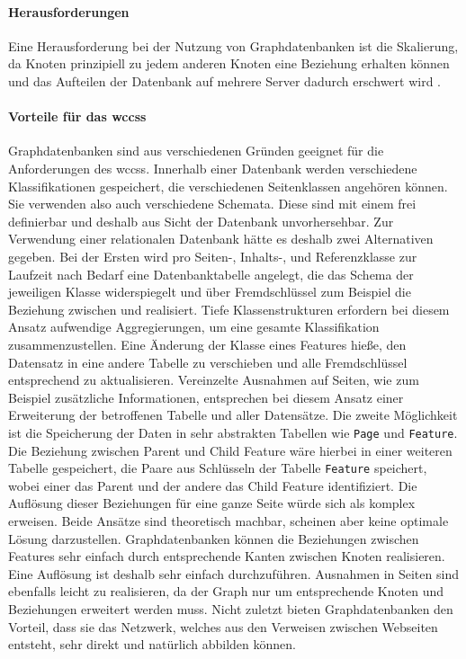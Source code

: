     \paragraph*{Herausforderungen}
    Eine Herausforderung bei der Nutzung von Graphdatenbanken ist die Skalierung,
    da Knoten prinzipiell zu jedem anderen Knoten eine Beziehung erhalten können
    und das Aufteilen der Datenbank auf mehrere Server dadurch erschwert wird
    \cite[Kapitel 11.2.5]{sadalage:nosql}.

    \paragraph*{Vorteile für das \glspl{wccs}}
    Graphdatenbanken sind aus verschiedenen Gründen geeignet für die Anforderungen des \glspl{wccs}.
    Innerhalb einer Datenbank werden verschiedene Klassifikationen gespeichert,
    die verschiedenen Seitenklassen angehören können.
    Sie verwenden also auch verschiedene Schemata.
    Diese sind mit einem {\classificationModel} frei definierbar und deshalb aus Sicht der Datenbank unvorhersehbar.
    Zur Verwendung einer relationalen Datenbank hätte es deshalb zwei Alternativen gegeben.
    Bei der Ersten wird pro Seiten-, Inhalts-, und Referenzklasse zur Laufzeit nach Bedarf eine Datenbanktabelle angelegt,
    die das Schema der jeweiligen Klasse widerspiegelt und über Fremdschlüssel zum Beispiel die Beziehung
    zwischen {\parentFeature} und {\childFeature} realisiert.
    Tiefe Klassenstrukturen erfordern bei diesem Ansatz aufwendige Aggregierungen,
    um eine gesamte Klassifikation zusammenzustellen.
    Eine Änderung der Klasse eines Features hieße, den Datensatz in eine andere Tabelle zu verschieben
    und alle Fremdschlüssel entsprechend zu aktualisieren.
    Vereinzelte Ausnahmen auf Seiten, wie zum Beispiel zusätzliche Informationen, entsprechen bei diesem Ansatz
    einer Erweiterung der betroffenen Tabelle und aller Datensätze.
    Die zweite Möglichkeit ist die Speicherung der Daten in sehr abstrakten Tabellen
    wie \texttt{Page} und \texttt{Feature}.
    Die Beziehung zwischen Parent und Child Feature wäre hierbei in einer weiteren Tabelle gespeichert,
    die Paare aus Schlüsseln der Tabelle \texttt{Feature} speichert, wobei einer das Parent und der andere das
    Child Feature identifiziert.
    Die Auflösung dieser Beziehungen für eine ganze Seite würde sich als komplex erweisen.
    Beide Ansätze sind theoretisch machbar, scheinen aber keine optimale Lösung darzustellen.
    Graphdatenbanken können die Beziehungen zwischen Features sehr einfach durch entsprechende Kanten zwischen Knoten realisieren.
    Eine Auflösung ist deshalb sehr einfach durchzuführen.
    Ausnahmen in Seiten sind ebenfalls leicht zu realisieren,
    da der Graph nur um entsprechende Knoten und Beziehungen erweitert werden muss.
    Nicht zuletzt bieten Graphdatenbanken den Vorteil,
    dass sie das Netzwerk, welches aus den Verweisen zwischen
    Webseiten entsteht, sehr direkt und natürlich abbilden können.
